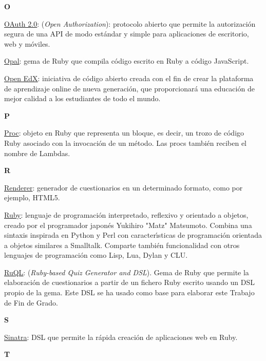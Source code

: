 \bigskip
{\bfseries {\Huge O}}\label{Apendice1:O}
\bigskip
\bigskip

\href{http://oauth.net/2/}{\underline{OAuth 2.0}}: (\textit{Open Authorization}): protocolo abierto que permite la autorizaci\'on segura de una API de modo est\'andar y simple para aplicaciones
de escritorio, web y m\'oviles.
\bigskip

\href{http://opalrb.org/}{\underline{Opal}}: gema de Ruby que compila c\'odigo escrito en Ruby a c\'odigo JavaScript.
\bigskip

\href{http://code.edx.org/}{\underline{Open EdX}}: iniciativa de c\'odigo abierto creada con el fin de crear la plataforma de aprendizaje online de nueva generaci\'on, que proporcionar\'a
una educaci\'on de mejor calidad a los estudiantes de todo el mundo.
\bigskip

\bigskip
{\bfseries {\Huge P}}\label{Apendice1:P}
\bigskip
\bigskip

\underline{Proc}: objeto en Ruby que representa un bloque, es decir, un trozo de c\'odigo Ruby asociado con la invocaci\'on de un m\'etodo. Las procs tambi\'en reciben el nombre
de Lambdas.
\newpage

\bigskip
{\bfseries {\Huge R}}\label{Apendice1:R}
\bigskip
\bigskip

\underline{Renderer}: generador de cuestionarios en un determinado formato, como por ejemplo, HTML5.
\bigskip

\href{https://www.ruby-lang.org/es}{\underline{Ruby}}: lenguaje de programaci\'on interpretado, reflexivo y orientado a objetos, creado por el programador japon\'es Yukihiro "Matz" Matsumoto. 
Combina una sintaxis inspirada en Python y Perl con caracter\'{\i}sticas de programaci\'on orientada a objetos similares a Smalltalk. Comparte tambi\'en funcionalidad con otros lenguajes de 
programaci\'on como Lisp, Lua, Dylan y CLU.
\bigskip

\href{http://github.com/saasbook/ruql}{\underline{RuQL}}: (\textit{Ruby-based Quiz Generator and DSL}). Gema de Ruby que permite la elaboraci\'on de cuestionarios a partir de un fichero Ruby
escrito usando un DSL propio de la gema. Este DSL se ha usado como base para elaborar este Trabajo de Fin de Grado.
\bigskip

\bigskip
{\bfseries {\Huge S}}\label{Apendice1:S}
\bigskip
\bigskip

\href{http://www.sinatrarb.com/}{\underline{Sinatra}}: DSL que permite la r\'apida creaci\'on de aplicaciones web en Ruby.
\bigskip

\bigskip
{\bfseries {\Huge T}}\label{Apendice1:T}
\bigskip
\bigskip

